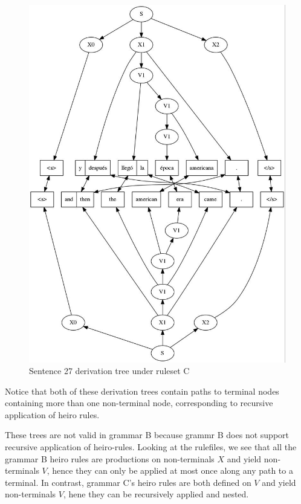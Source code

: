 \documentclass[a4paper,oneside,reqno]{amsart}
\begin{document}
\begin{enumerate}[label=\arabic*.]
\begin{figure}[h!]
\begin{center}
        \includegraphics[scale=0.5]{../output/tree27Cdvn1.jpg}
      \end{center}
      \caption{Sentence 27 derivation tree under ruleset C}
      \label{fig:27-c-tree}
    \end{figure}
    Notice that both of these derivation trees contain paths to terminal nodes
    containing more than one non-terminal node, corresponding to recursive application
    of heiro rules.

    These trees are not valid in grammar B because grammr B does not support recursive
    application of heiro-rules. Looking at the rulefiles, we see that all the
    grammar B heiro rules are productions on non-terminals $X$ and yield
    non-terminals $V$, hence they can only be applied at most once along any
    path to a terminal. In contrast, grammar C's heiro rules are both defined
    on $V$ and yield non-terminals $V$, hene they can be recursively applied
    and nested.
\end{enumerate}

%
%


\end{document}
